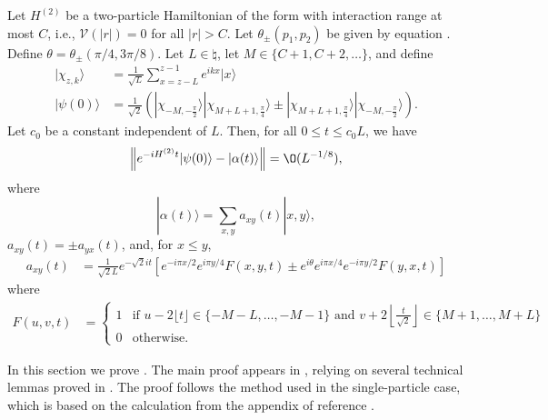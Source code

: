 \documentclass[../thesis-main/thesis-main]{subfiles}
\begin{document}
\begin{theorem}
\label{thm:twopart}Let $H^{(2)}$ be a two-particle Hamiltonian of the form  with interaction range at most $C$, i.e., $\mathcal{V}(|r|)=0$ for all $|r|>C$. Let $\theta_{\pm}(p_1,p_2)$ be given by equation . Define $\theta=\theta_{\pm}({\pi}/{4},{3\pi}/{8})$. Let $L\in\natural$, let $M\in\{C+1,C+2,\ldots\}$, and define
\begin{align*}
|\chi_{z,k}\rangle & =  \frac{1}{\sqrt{L}}\sum_{x=z-L}^{z-1}e^{ikx}|x\rangle\\
|\psi(0)\rangle & =  \frac{1}{\sqrt{2}}\left(|\chi_{-M,-\frac{\pi}{2}}\rangle|\chi_{M+L+1,\frac{\pi}{4}}\rangle 
	\pm |\chi_{M+L+1,\frac{\pi}{4}}\rangle|\chi_{-M,-\frac{\pi}{2}}\rangle\right).
\end{align*}
Let $c_{0}$ be a constant independent of $L$. Then, for all $0\leq t\leq c_{0}L$, we have
\[
\left\Vert e^{-iH^{(2)}t}|\psi(0)\rangle-|\alpha(t)\rangle\right\Vert =\O(L^{-{1}/{8}}),
\]
where 
\begin{equation}
|\alpha(t)\rangle=\sum_{x,y}a_{xy}(t)|x,y\rangle,
\label{eq:alpha}
\end{equation}
$a_{xy}(t)=\pm a_{yx}(t)$, and, for $x\leq y$, 
\begin{align}
a_{xy}(t) & =  \frac{1}{\sqrt{2}L}e^{-\sqrt{2}it}\left[e^{-i \pi x/2} e^{i \pi y/4} F(x,y,t) 
    \pm e^{i\theta} e^{i \pi x/4} e^{-i \pi y/2} F(y,x,t) \right]
\label{eq:a_xy}
\end{align}
where
\begin{align*}
F(u,v,t) & =  \begin{cases}
	1 & \text{if }u-2 \lfloor t \rfloor\in\{-M-L,\ldots,-M-1\}\text{ and }v+2\left\lfloor \frac{t}{\sqrt{2}}
	\right\rfloor \in\{M+1,\ldots,M+L\}\\
	0 & \text{otherwise.}\end{cases}
\end{align*}
\end{theorem}

In this section we prove . The main proof appears in , relying on several technical lemmas proved in . The proof follows the method used in the single-particle case, which is based on the calculation from the appendix of reference \cite{FGG08}.
\end{document}
